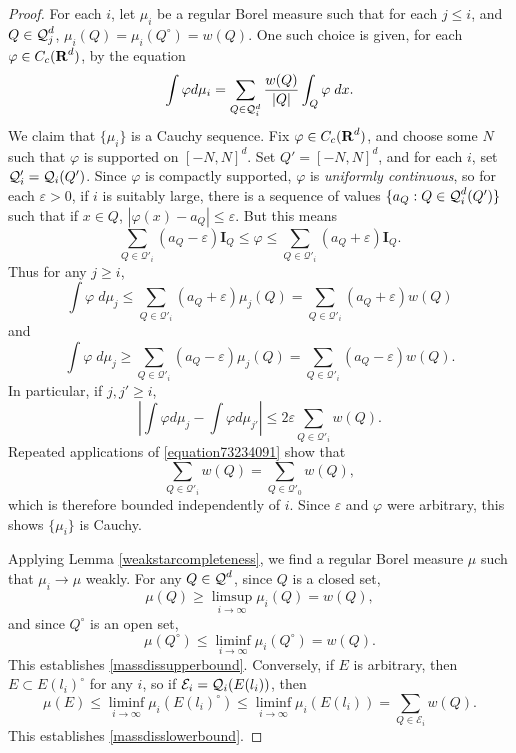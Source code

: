 \begin{proof}
	For each $i$, let $\mu_i$ be a regular Borel measure such that for each $j \leq i$, and $Q \in \operatorname{\mathcal{Q}}_j^d$, $\mu_i(Q) = \mu_i(Q^\circ) = w(Q)$. One such choice is given, for each $\varphi \in C_c(\operatorname{\mathbf{R}}^d)$, by the equation
	\[ \int \varphi d\mu_i = \sum_{Q \in \operatorname{\mathcal{Q}}_i^d} \frac{w(Q)}{|Q|} \int_Q \varphi\; dx. \]
	We claim that $\{ \mu_i \}$ is a Cauchy sequence. Fix $\varphi \in C_c(\operatorname{\mathbf{R}}^d)$, and choose some $N$ such that $\varphi$ is supported on $[-N,N]^d$. Set $Q' = [-N,N]^d$, and for each $i$, set $\mathcal{Q}'_i = \operatorname{\mathcal{Q}}_i(Q')$. Since $\varphi$ is compactly supported, $\varphi$ is \emph{uniformly continuous}, so for each $\varepsilon > 0$, if $i$ is suitably large, there is a sequence of values $\{ a_Q : Q \in \operatorname{\mathcal{Q}}_i^d(Q') \}$ such that if $x \in Q$, $|\varphi(x) - a_Q| \leq \varepsilon$. But this means
	\[ \sum_{Q \in \mathcal{Q}'_i} (a_Q - \varepsilon) \mathbf{I}_Q \leq \varphi \leq \sum_{Q \in \mathcal{Q}'_i} (a_Q + \varepsilon) \mathbf{I}_Q. \]
	Thus for any $j \geq i$,
	\[ \int \varphi\; d\mu_j\leq \sum_{Q \in \mathcal{Q}'_i} (a_Q + \varepsilon) \mu_j(Q) = \sum_{Q \in \mathcal{Q}'_i} (a_Q + \varepsilon) w(Q) \]
	and
	\[ \int \varphi\; d\mu_j \geq \sum_{Q \in \mathcal{Q}'_i} (a_Q - \varepsilon) \mu_j(Q) = \sum_{Q \in \mathcal{Q}'_i} (a_Q - \varepsilon) w(Q). \]
	In particular, if $j,j' \geq i$,
	\[ \left| \int \varphi d\mu_j - \int \varphi d\mu_{j'} \right| \leq 2 \varepsilon \sum_{Q \in \mathcal{Q}'_i} w(Q). \]
	Repeated applications of \eqref{equation73234091} show that
	\[ \sum_{Q \in \mathcal{Q}'_i} w(Q) = \sum_{Q \in \mathcal{Q}'_0} w(Q), \]
	which is therefore bounded independently of $i$. Since $\varepsilon$ and $\varphi$ were arbitrary, this shows $\{ \mu_i \}$ is Cauchy.

	Applying Lemma \ref{weakstarcompleteness}, we find a regular Borel measure $\mu$ such that $\mu_i \to \mu$ weakly. For any $Q \in \operatorname{\mathcal{Q}}^d$, since $Q$ is a closed set,
	\[ \mu(Q) \geq \limsup_{i \to \infty} \mu_i(Q) = w(Q), \]
	and since $Q^\circ$ is an open set,
	\[ \mu(Q^\circ) \leq \liminf_{i \to \infty} \mu_i(Q^\circ) = w(Q). \]
	This establishes \eqref{massdissupperbound}. Conversely, if $E$ is arbitrary, then $E \subset E(l_i)^\circ$ for any $i$, so if $\mathcal{E}_i = \operatorname{\mathcal{Q}}_i(E(l_i))$, then
	\[ \mu(E) \leq \liminf_{i \to \infty} \mu_i(E(l_i)^\circ) \leq \liminf_{i \to \infty} \mu_i(E(l_i)) = \sum_{Q \in \mathcal{E}_i} w(Q). \]
	This establishes \eqref{massdisslowerbound}.
\end{proof}

